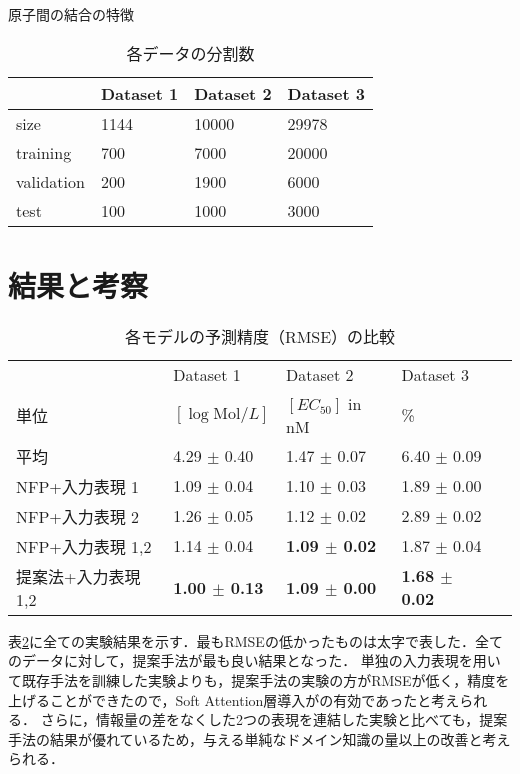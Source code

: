 \documentclass[twocolumn]{jarticle}
\begin{document}
\begin{table}[htb]
  \caption{原子間の結合の特徴}
      \vspace{1em}
  \label{tab:bond}
  \begin{tabular}{llll} \hline
	& Dataset 1  & Dataset 2 & Dataset 3 \\ \hline \hline
	size & 1144 & 10000 & 29978 \\ 
	training & 700 & 7000 & 20000 \\ 
	validation & 200 & 1900 & 6000 \\ 
	test & 100 & 1000 & 3000 \\ \hline
  \end{tabular}
        \vspace{-2ex}
  \caption{各データの分割数}
  \label{tab:data}
\end{table}

\vspace{-10pt}
\section{結果と考察}
\begin{table}[htb]
\scriptsize
  \begin{tabular}{lllll}\hline
  			 				   &  Dataset 1 \cite{delaney} & Dataset 2 \cite{malaria} & Dataset 3 \cite{cep}    \\  
	単位	    			   &     $[\log{\mathrm{Mol}/L}]$    &     $[EC_{50}]$ in nM & \%                   \\ \hline \hline
	 平均\cite{NNFP}	       &     4.29 $\pm$ 0.40    &     1.47 $\pm$ 0.07   &     6.40 $\pm$ 0.09  \\ \hline 
	NFP+入力表現 1 			   &     1.09 $\pm$ 0.04    &     1.10 $\pm$ 0.03   &     1.89 $\pm$ 0.00  \\ 
	NFP+入力表現 2 			   &     1.26 $\pm$ 0.05    &     1.12 $\pm$ 0.02   &     2.89 $\pm$ 0.02  \\ 
	NFP+入力表現 1,2	 	   &     1.14 $\pm$ 0.04    & \bf{1.09 $\pm$ 0.02}  &     1.87 $\pm$ 0.04  \\ 
	提案法+入力表現 1,2 & \bf{1.00 $\pm$ 0.13}   & \bf{1.09 $\pm$ 0.00}  & \bf{1.68 $\pm$ 0.02} \\ \hline
  \end{tabular}
        \vspace{-2ex}
  \caption{各モデルの予測精度（RMSE）の比較}
  \label{tab:rmse}
\end{table}

表\ref{tab:rmse}に全ての実験結果を示す．最もRMSEの低かったものは太字で表した．全てのデータに対して，提案手法が最も良い結果となった．
単独の入力表現を用いて既存手法を訓練した実験よりも，提案手法の実験の方がRMSEが低く，精度を上げることができたので，Soft Attention層導入がの有効であったと考えられる．
さらに，情報量の差をなくした2つの表現を連結した実験と比べても，提案手法の結果が優れているため，与える単純なドメイン知識の量以上の改善と考えられる．
\end{document}
